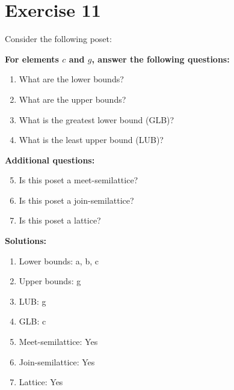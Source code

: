 \documentclass{article}
\begin{document}
\section*{Exercise 11}
Consider the following poset:
\begin{center}
\end{center}

    \textbf{For elements $c$ and $g$, answer the following questions:}
\begin{enumerate}
    \item What are the lower bounds?
    \item What are the upper bounds?
    \item What is the greatest lower bound (GLB)?
    \item What is the least upper bound (LUB)?
\end{enumerate}
    \hspace*{3ex} \textbf{Additional questions:}
\begin{enumerate}
    \setcounter{enumi}{4}
    \item Is this poset a meet-semilattice?
    \item Is this poset a join-semilattice?
    \item Is this poset a lattice?
\end{enumerate}

\textbf{Solutions:}
\begin{enumerate}
    \item Lower bounds: {a, b, c}
    \item Upper bounds: {g}
    \item LUB: g
    \item GLB: c
    \item Meet-semilattice: Yes
    \item Join-semilattice: Yes
    \item Lattice: Yes
\end{enumerate}
\newpage
\end{document}
